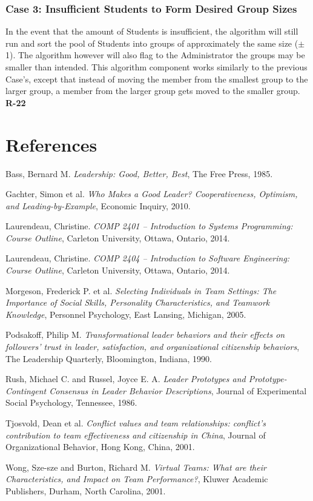 \documentclass[12pt,letterpaper]{article}
\begin{document}
\subsubsection{Case 3: Insufficient Students to Form Desired Group Sizes}

In the event that the amount of Students is insufficient, the algorithm will still run and sort the pool of Students into groups of approximately the same size ($\pm$ 1). The algorithm however will also flag to the Administrator the groups may be smaller than intended. This algorithm component works similarly to the previous Case's, except that instead of moving the member from the smallest group to the larger group, a member from the larger group gets moved to the smaller group. {\bf R-22}

\renewcommand\refname{\vskip -1cm}
\section{References}

\begin{thebibliography}{16}
Bass, Bernard M.
{\it Leadership: Good, Better, Best},
The Free Press, 1985.

Gachter, Simon et al.
{\it Who Makes a Good Leader? Cooperativeness, Optimism, and Leading-by-Example},
Economic Inquiry, 2010.

Laurendeau, Christine.
{\it COMP 2401 -- Introduction to Systems Programming: Course Outline},
Carleton University, Ottawa, Ontario, 2014.

Laurendeau, Christine.
{\it COMP 2404 -- Introduction to Software Engineering: Course Outline},
Carleton University, Ottawa, Ontario, 2014.

Morgeson, Frederick P. et al.
{\it Selecting Individuals in Team Settings: The Importance of Social Skills, Personality Characteristics, and Teamwork Knowledge},
Personnel Psychology, East Lansing, Michigan, 2005.

Podsakoff, Philip M.
{\it Transformational leader behaviors and their effects on followers' trust in leader, satisfaction, and organizational citizenship behaviors},
The Leadership Quarterly, Bloomington, Indiana, 1990.

Rush, Michael C. and Russel, Joyce E. A.
{\it Leader Prototypes and Prototype-Contingent Consensus in Leader Behavior Descriptions},
Journal of Experimental Social Psychology, Tennessee, 1986.

Tjosvold, Dean et al.
{\it Conflict values and team relationships: conflict's contribution to team effectiveness and citizenship in China},
Journal of Organizational Behavior, Hong Kong, China, 2001.

Wong, Sze-sze and Burton, Richard M.
{\it Virtual Teams: What are their Characteristics, and Impact on Team Performance?},
Kluwer Academic Publishers, Durham, North Carolina, 2001.

\end{thebibliography}
\end{document}
